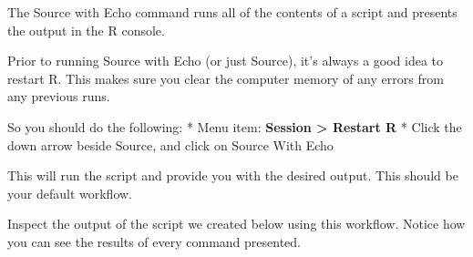 \documentclass[
]{krantz}
\begin{document}
The Source with Echo command runs all of the contents of a script and presents the output in the R console.

Prior to running Source with Echo (or just Source), it's always a good idea to restart R. This makes sure you clear the computer memory of any errors from any previous runs.

So you should do the following:
* Menu item: \textbf{Session \textgreater{} Restart R}
* Click the down arrow beside Source, and click on Source With Echo

This will run the script and provide you with the desired output. This should be your default workflow.

Inspect the output of the script we created below using this workflow. Notice how you can see the results of every command presented.
\end{document}
